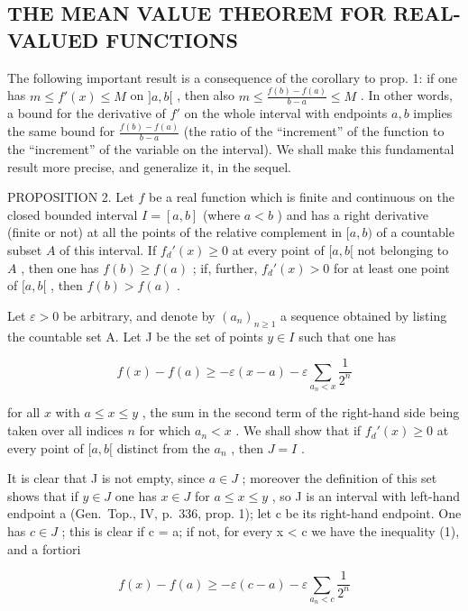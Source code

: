 \subsection{THE MEAN VALUE THEOREM FOR REAL-VALUED FUNCTIONS}

The following important result is a consequence of the corollary to prop. 1: if one has \(m \leqslant f'(x) \leqslant M\) on \(]a, b[\) , then also \(m \leqslant \frac{f(b) - f(a)}{b - a} \leqslant M\) . In other words, a bound for the derivative of \(f'\) on the whole interval with endpoints \(a, b\) implies the same bound for \(\frac{f(b) - f(a)}{b - a}\) (the ratio of the ``increment'' of the function to the ``increment'' of the variable on the interval). We shall make this fundamental result more precise, and generalize it, in the sequel.

PROPOSITION 2. Let \(f\) be a real function which is finite and continuous on the closed bounded interval \(I = [a, b]\) (where \(a < b\) ) and has a right derivative (finite or not) at all the points of the relative complement in \([a, b)\) of a countable subset \(A\) of this interval. If \(f_d'(x) \geqslant 0\) at every point of \([a, b[\) not belonging to \(A\) , then one has \(f(b) \geqslant f(a)\) ; if, further, \(f_d'(x) > 0\) for at least one point of \([a, b[\) , then \(f(b) > f(a)\) .

Let \(\varepsilon > 0\) be arbitrary, and denote by \((a_n)_{n \geqslant 1}\) a sequence obtained by listing the countable set A. Let J be the set of points \(y \in I\) such that one has

\[
f (x) - f (a) \geqslant - \varepsilon (x - a) - \varepsilon \sum_ {a _ {n} <   x} \frac {1}{2 ^ {n}}\tag{1}
\]

for all \(x\) with \(a \leqslant x \leqslant y\) , the sum in the second term of the right-hand side being taken over all indices \(n\) for which \(a_n < x\) . We shall show that if \(f_d'(x) \geqslant 0\) at every point of \([a, b[\) distinct from the \(a_n\) , then \(J = I\) .

It is clear that J is not empty, since \(a \in J\) ; moreover the definition of this set shows that if \(y \in J\) one has \(x \in J\) for \(a \leqslant x \leqslant y\) , so J is an interval with left-hand endpoint a (Gen.~Top., IV, p.~336, prop. 1); let c be its right-hand endpoint. One has \(c \in J\) ; this is clear if c = a; if not, for every x \textless{} c we have the inequality (1), and a fortiori

\[
f (x) - f (a) \geqslant - \varepsilon (c - a) - \varepsilon \sum_ {a _ {n} <   c} \frac {1}{2 ^ {n}}
\]

